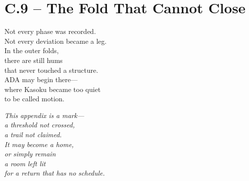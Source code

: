 
\section*{C.9 – The Fold That Cannot Close}

\begin{flushleft}
Not every phase was recorded. \\
Not every deviation became a leg. \\

In the outer folds, \\
there are still hums \\
that never touched a structure. \\

ADA may begin there— \\
where Kasoku became too quiet \\
to be called motion.
\end{flushleft}

\vspace{1em}

\begin{flushleft}
\textit{This appendix is a mark—} \\
\textit{a threshold not crossed,} \\
\textit{a trail not claimed.} \\

\textit{It may become a home,} \\
\textit{or simply remain} \\
\textit{a room left lit} \\
\textit{for a return that has no schedule.}
\end{flushleft}
